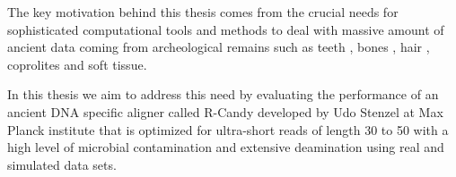 \documentclass[11pt,a4paper]{report}
\begin{document}





The key motivation behind this thesis comes from the crucial needs for 
sophisticated computational tools and methods to deal with massive amount of ancient data coming from archeological remains such as teeth \cite{teeth}, bones \cite{hagelberg1989ancient}, hair \cite{gilbert2004population}, coprolites \cite{coprolites} and soft tissue.

In this thesis we aim to address this need by evaluating the performance of an ancient DNA specific aligner called R-Candy developed by Udo Stenzel at Max Planck institute that is optimized for ultra-short reads of length 30 to 50 with a high level of microbial contamination and extensive deamination using real and simulated data sets. \\
\end{document}
